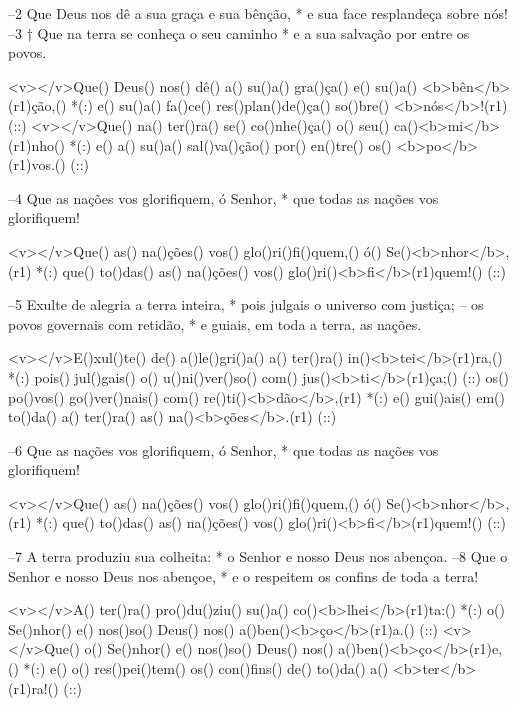 –2 Que Deus nos dê a sua graça e sua bênção, *
e sua face resplandeça sobre nós!
–3 † Que na terra se conheça o seu caminho *
e a sua salvação por entre os povos.

<v></v>Que() Deus() nos() dê() a() su()a() gra()ça() e() su()a() <b>bên</b>(r1)ção,() *(:)
e() su()a() fa()ce() res()plan()de()ça() so()bre() <b>nós</b>!(r1) (::)
<v></v>Que() na() ter()ra() se() co()nhe()ça() o() seu() ca()<b>mi</b>(r1)nho() *(:)
e() a() su()a() sal()va()ção() por() en()tre() os() <b>po</b>(r1)vos.() (::)

–4 Que as nações vos glorifiquem, ó Senhor, *
que todas as nações vos glorifiquem!

<v></v>Que() as() na()ções() vos() glo()ri()fi()quem,() ó() Se()<b>nhor</b>,(r1) *(:)
que() to()das() as() na()ções() vos() glo()ri()<b>fi</b>(r1)quem!() (::)

–5 Exulte de alegria a terra inteira, *
pois julgais o universo com justiça;
– os povos governais com retidão, *
e guiais, em toda a terra, as nações.

<v></v>E()xul()te() de() a()le()gri()a() a() ter()ra() in()<b>tei</b>(r1)ra,() *(:)
pois() jul()gais() o() u()ni()ver()so() com() jus()<b>ti</b>(r1)ça;() (::)
os() po()vos() go()ver()nais() com() re()ti()<b>dão</b>,(r1) *(:)
e() gui()ais() em() to()da() a() ter()ra() as() na()<b>ções</b>.(r1) (::)

–6 Que as nações vos glorifiquem, ó Senhor, *
que todas as nações vos glorifiquem!

<v></v>Que() as() na()ções() vos() glo()ri()fi()quem,() ó() Se()<b>nhor</b>,(r1) *(:)
que() to()das() as() na()ções() vos() glo()ri()<b>fi</b>(r1)quem!() (::)

–7 A terra produziu sua colheita: *
o Senhor e nosso Deus nos abençoa.
–8 Que o Senhor e nosso Deus nos abençoe, *
e o respeitem os confins de toda a terra!

<v></v>A() ter()ra() pro()du()ziu() su()a() co()<b>lhei</b>(r1)ta:() *(:)
o() Se()nhor() e() nos()so() Deus() nos() a()ben()<b>ço</b>(r1)a.() (::)
<v></v>Que() o() Se()nhor() e() nos()so() Deus() nos() a()ben()<b>ço</b>(r1)e,() *(:)
e() o() res()pei()tem() os() con()fins() de() to()da() a() <b>ter</b>(r1)ra!() (::)